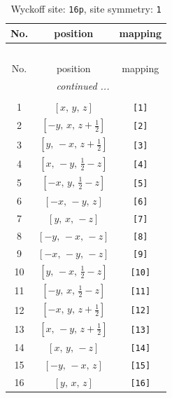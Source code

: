 \documentclass[fleqn,8pt]{jsarticle}
\begin{document}
\begin{longtable}{ccc}
\caption{Wyckoff site: {\tt 16p}, site symmetry: {\tt 1}}
 \\
 \hline \hline
No. & position & mapping \\ \hline \endfirsthead

\multicolumn{2}{l}{\tablename\ \thetable{}} \\
 \hline \hline
No. & position & mapping \\ \hline \endhead

 \hline \hline
\multicolumn{2}{r}{\footnotesize\it continued ...} \\ \endfoot

 \hline \hline
\multicolumn{2}{r}{} \\ \endlastfoot

1 & $\left[ x,\, y,\, z \right]$ & {\tt [1]} \\ \hline
2 & $\left[ - y,\, x,\, z + \frac{1}{2} \right]$ & {\tt [2]} \\ \hline
3 & $\left[ y,\, - x,\, z + \frac{1}{2} \right]$ & {\tt [3]} \\ \hline
4 & $\left[ x,\, - y,\, \frac{1}{2} - z \right]$ & {\tt [4]} \\ \hline
5 & $\left[ - x,\, y,\, \frac{1}{2} - z \right]$ & {\tt [5]} \\ \hline
6 & $\left[ - x,\, - y,\, z \right]$ & {\tt [6]} \\ \hline
7 & $\left[ y,\, x,\, - z \right]$ & {\tt [7]} \\ \hline
8 & $\left[ - y,\, - x,\, - z \right]$ & {\tt [8]} \\ \hline
9 & $\left[ - x,\, - y,\, - z \right]$ & {\tt [9]} \\ \hline
10 & $\left[ y,\, - x,\, \frac{1}{2} - z \right]$ & {\tt [10]} \\ \hline
11 & $\left[ - y,\, x,\, \frac{1}{2} - z \right]$ & {\tt [11]} \\ \hline
12 & $\left[ - x,\, y,\, z + \frac{1}{2} \right]$ & {\tt [12]} \\ \hline
13 & $\left[ x,\, - y,\, z + \frac{1}{2} \right]$ & {\tt [13]} \\ \hline
14 & $\left[ x,\, y,\, - z \right]$ & {\tt [14]} \\ \hline
15 & $\left[ - y,\, - x,\, z \right]$ & {\tt [15]} \\ \hline
16 & $\left[ y,\, x,\, z \right]$ & {\tt [16]} \\
\end{longtable}
\end{document}
